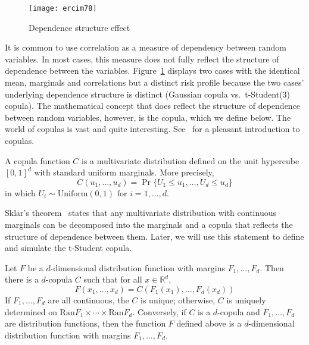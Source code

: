 \documentclass[11pt,fleqn]{book} %
\begin{document}
\begin{figure}
	\vspace{-25pt}
	\begin{center}
		\texttt{[image: ercim78]}
	\end{center}
	\vspace{-10pt}
	\caption{Dependence structure effect}
	\vspace{-10pt}
	\label{fig:copula_effect}
\end{figure}
It is common to use correlation as a measure of dependency between random 
variables. In most cases, this measure does not fully reflect the structure 
of dependence between the variables. Figure~\ref{fig:copula_effect} displays 
two cases with the identical mean, marginals and correlations but a distinct 
risk profile because the two cases' underlying  dependence structure is 
distinct (Gaussian copula vs.\ t-Student(3) copula). The mathematical concept 
that does reflect the structure of dependence between random variables, 
however, is the copula, which we define below. The world of copulas is vast 
and quite interesting. See~\cite[chap. 5]{mcneil:2005} for a pleasant 
introduction to copulas.

\begin{definition}[Copula]
	A copula function $C$ is a multivariate distribution defined on the 
	unit hypercube $[0,1]^d$ with standard uniform marginals. 
	More precisely,
	\begin{displaymath}
		C(u_1, \dots, u_d) = \Pr\{U_1 \le u_1, \dots, U_d \le u_d\}
	\end{displaymath}
	in which $U_i \sim \text{Uniform}(0,1) \text{ for } i = 1,\dots, d$.
\end{definition}

Sklar's theorem~\cite{sklar:1959} states that any multivariate 
distribution with continuous marginals can be decomposed into the marginals and 
a copula that reflects the structure of dependence between them. Later, we will 
use this statement to define and simulate the t-Student copula.

\begin{theorem}
	\label{thm:sklar}
	Let $F$ be a $d$-dimensional distribution function with margins 
	$F_1,\dots,F_d$. Then there is a $d$-copula $C$ such that for all 
	$x \in \mathbb{R}^d$,
	\begin{displaymath}
		F(x_1,\dots,x_d) = C(F_1(x_1),\dots,F_d(x_d))
	\end{displaymath}
	If $F_1,\dots,F_d$ are all continuous, the $C$ is unique; otherwise, $C$ is 
	uniquely determined on $\text{Ran}F_1 \times \cdots \times \text{Ran}F_d$.
	Conversely, if $C$ is a $d$-copula and $F_1,\dots,F_d$ are distribution 
	functions, then the function $F$ defined above is a $d$-dimensional 
	distribution function with margins $F_1,\dots,F_d$.
\end{theorem}
\end{document}
